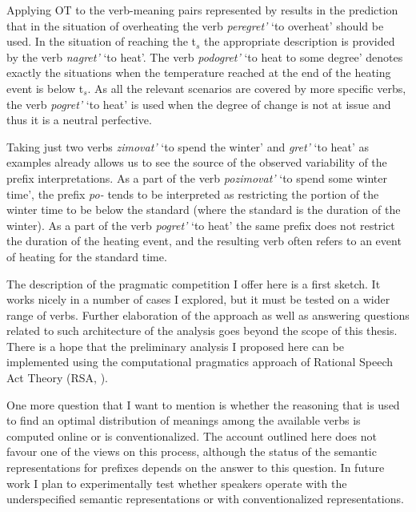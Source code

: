 Applying OT to the verb-meaning pairs represented by  results in the prediction that in the situation of overheating the verb \textit{peregret'} `to overheat' should be used. In the situation of reaching the t$_s$ the appropriate description is provided by the verb \textit{nagret'} `to heat'. The verb \textit{podogret'} `to heat to some degree' denotes exactly the situations when the temperature reached at the end of the heating event is below t$_s$. As all the relevant scenarios are covered by more specific verbs, the verb \textit{pogret'} `to heat' is used when the degree of change is not at issue and thus it is a neutral perfective.

Taking just two verbs \textit{zimovat'} `to spend the winter' and \textit{gret'} `to heat' as examples already allows us to see the source of the observed variability of the prefix interpretations. As a part of the verb \textit{pozimovat'} `to spend some winter time', the prefix \textit{po-} tends to be interpreted as restricting the portion of the winter time to be below the standard (where the standard is the duration of the winter). As a part of the verb \textit{pogret'} `to heat' the same prefix does not restrict the duration of the heating event, and the resulting verb often refers to an event of heating for the standard time. 

The description of the pragmatic competition I offer here is a first sketch. It works nicely in a number of cases I explored, but it must be tested on a wider range of verbs. Further elaboration of the approach as well as answering questions related to such architecture of the analysis goes beyond the scope of this thesis. There is a hope that the preliminary analysis I proposed here can be implemented using the computational pragmatics approach of Rational Speech Act Theory (RSA, \citealt{Franke:09, FrankGoodman:12, GoodmanStuhlmuller:13, FrankeJager:15, GoodmanFrank:16}). 

One more question that I want to mention is whether the reasoning that is used to find an optimal distribution of meanings among the available verbs is computed online or is conventionalized. The account outlined here does not favour one of the views on this process, although the status of the semantic representations for prefixes depends on the answer to this question. In future work I plan to experimentally test whether speakers operate with the underspecified semantic representations or with conventionalized representations. 


